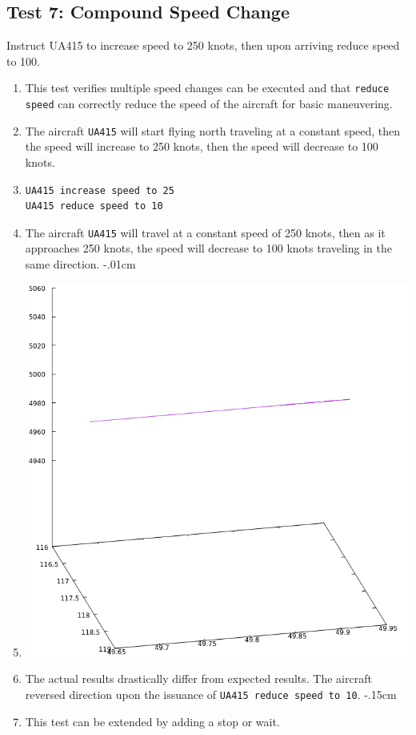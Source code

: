 \documentclass[letterpaper, 12pt]{article}
\begin{document}
\subsection{Test 7: Compound Speed Change}
Instruct UA415 to increase speed to 250 knots, then upon arriving reduce speed to 100.
\begin{enumerate}\itemsep-.15cm
\item This test verifies multiple speed changes can be executed and that \verb!reduce speed! can correctly reduce the speed of the aircraft for basic maneuvering.
\item The aircraft \verb!UA415! will start flying north traveling at a constant speed, then the speed will increase to 250 knots, then the speed will decrease to 100 knots.
\item \begin{verbatim}
UA415 increase speed to 25
UA415 reduce speed to 10
\end{verbatim}
\item The aircraft \verb!UA415! will travel at a constant speed of 250 knots, then as it approaches 250 knots, the speed will decrease to 100 knots traveling in the same direction.
\itemsep-.01cm
\item \includegraphics[scale=.4,valign=t,center]{test7.png}
\item The actual results drastically differ from expected results. The aircraft reversed direction upon the issuance of \verb!UA415 reduce speed to 10!.
\itemsep-.15cm
\item This test can be extended by adding a stop or wait.
\end{enumerate}
\end{document}

